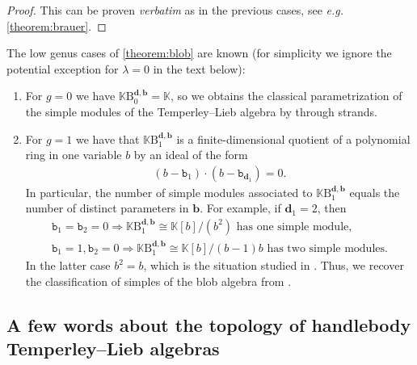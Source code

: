 \documentclass[a4paper,11pt]{amsart}
\newcommand{\eg}{\textsl{e.g.}}
\newcommand{\ver}{\textsl{verbatim}}
\newcommand{\setstuff}[1]{\mathrm{#1}}
\newcommand{\K}{\mathbb{K}}
\newcommand{\bsym}[1]{\boldsymbol{#1}}
\newcommand{\varsym}[1]{\mathtt{#1}}
\newcommand{\bpar}{\bsym{b}}
\newcommand{\bvar}{\varsym{b}}
\newcommand{\dpar}{\bsym{d}}
\numberwithin{equation}{section}
\let\fullref\autoref
\begin{document}
\begin{proof}
This can be proven {\ver} as in the previous cases, see {\eg} 
\fullref{theorem:brauer}.
\end{proof}

\begin{example}
The low genus cases of \fullref{theorem:blob} are known 
(for simplicity we ignore the potential exception 
for $\lambda=0$ in the text below):	

\begin{enumerate}

\item For $g=0$ we have $\K\setstuff{B}_{0}^{\dpar,\bpar}=\K$, so we obtains 
the classical parametrization of the simple modules of 
the Temperley--Lieb algebra by through strands.

\item For $g=1$ we have that $\K\setstuff{B}_{1}^{\dpar,\bpar}$ is 
a finite-dimensional quotient of a polynomial ring in one variable $b$
by an ideal of the form
\begin{gather*}
(b-\bvar_{1})\cdot (b-\bvar_{\dpar_{1}})=0.
\end{gather*} 
In particular, the number of simple modules associated to 
$\K\setstuff{B}_{1}^{\dpar,\bpar}$ equals the number of distinct 
parameters in $\bpar$. For example, if $\dpar_{1}=2$, then
\begin{gather*}
\bvar_{1}=\bvar_{2}=0\Rightarrow
\K\setstuff{B}_{1}^{\dpar,\bpar}\cong\K[b]/(b^{2})
\text{ has one simple module},
\\
\bvar_{1}=1,\bvar_{2}=0\Rightarrow
\K\setstuff{B}_{1}^{\dpar,\bpar}\cong\K[b]/(b-1)b
\text{ has two simple modules}.
\end{gather*}
In the latter case $b^{2}=b$, 
which is the situation studied in \cite{MaSa-blob}.
Thus, we recover the classification of simples of the blob 
algebra from \cite{MaSa-blob}.
\end{enumerate}

\end{example}

\subsection{A few words about the topology of handlebody Temperley--Lieb algebras}\label{subsection:handlebody-tl-topology}
\end{document}
